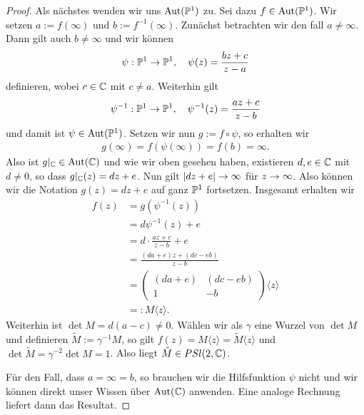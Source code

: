 \begin{proof}
  Als nächstes wenden wir uns $\Aut(\P^1)$ zu. Sei dazu $f \in
  \Aut(\P^1)$. Wir setzen $a:= f(\infty)$ und $b :=
  f^{-1}(\infty)$. Zunächst betrachten wir den fall $a \neq
  \infty$. Dann gilt auch $b \neq \infty$ und wir können
  \[
  \psi: \P^1 \ra \P^1, \quad \psi(z) = \frac{bz + c}{z - a}
  \]
  definieren, wobei $c \in \C$ mit $c \neq a$. Weiterhin gilt
  \[
  \psi^{-1}: \P^1 \ra \P^1, \quad \psi^{-1}(z) = \frac{az +c}{z -b}
  \]
  und damit ist $\psi \in \Aut(\P^1)$. Setzen wir nun $g := f \circ
  \psi$, so erhalten wir
  \begin{align*}
    g(\infty) = f(\psi(\infty)) = f(b) = \infty.
  \end{align*}
  Also ist $g|_\C \in \Aut(\C)$ und wie wir oben gesehen haben,
  existieren $d,e \in \C$ mit $d \neq 0$, so dass $g|_\C(z) = dz +
  e$. Nun gilt $|dz + e| \ra \infty$ für $z \ra \infty$. Also können
  wir die Notation $g(z) = dz+e$ auf ganz $\P^1$ fortsetzen. Insgesamt
  erhalten wir
  \begin{align*}
    f(z) & = g(\psi^{-1}(z)) \\
    & = d\psi^{-1}(z) + e \\
    & = d \cdot \frac{az + c}{z - b} + e \\
    & = \frac{(da + e) z + (dc - eb)}{z - b} \\
    & =
    \begin{pmatrix}
      (da + e) & (dc - eb) \\
      1 & -b
    \end{pmatrix}\langle z \rangle \\
    & =: M\langle z \rangle.
  \end{align*}
  Weiterhin ist $\det M = d( a-c) \neq 0$. Wählen wir als $\gamma$
  eine Wurzel von $\det M$ und definieren $\tilde M := \gamma^{-1} M$,
  so gilt $f(z) = M\langle z \rangle = \tilde M \langle z \rangle$ und
  $\det \tilde M = \gamma^{-2} \det M = 1$. Also liegt $\tilde M \in
  PSl(2, \C)$.

  Für den Fall, dass $a = \infty = b$, so brauchen wir die
  Hilfsfunktion $\psi$ nicht und wir können direkt unser Wissen über
  $\Aut(\C)$ anwenden. Eine analoge Rechnung liefert dann das
  Resultat.


\end{proof}
